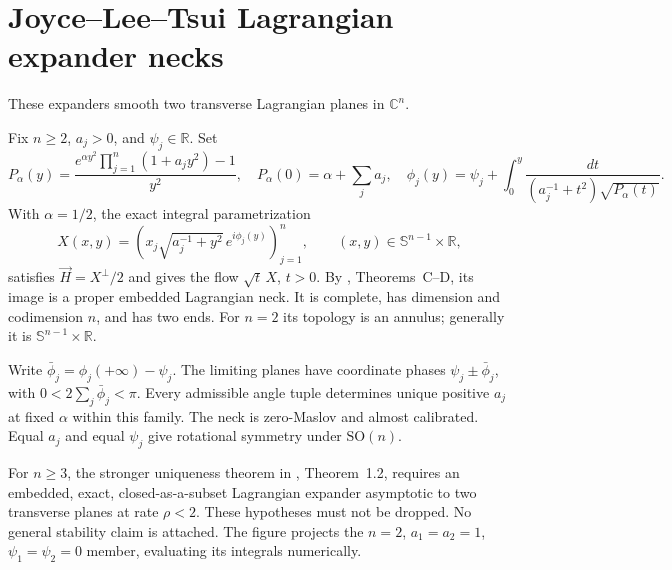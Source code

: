 \chapter{Joyce--Lee--Tsui Lagrangian expander necks}\label{sec:catalogue-jlt-expanders}
These expanders smooth two transverse Lagrangian planes in $\mathbb C^n$.
\begin{example}\label{ex:catalogue-jlt-expanders}
Fix $n\geq2$, $a_j>0$, and $\psi_j\in\mathbb R$. Set
\[
 P_\alpha(y)=\frac{e^{\alpha y^2}\prod_{j=1}^n(1+a_jy^2)-1}{y^2},
 \quad P_\alpha(0)=\alpha+\sum_ja_j,\quad
 \phi_j(y)=\psi_j+\int_0^y\frac{dt}{(a_j^{-1}+t^2)\sqrt{P_\alpha(t)}}.
\]
With $\alpha=1/2$, the exact integral parametrization
\[
 X(x,y)=\left(x_j\sqrt{a_j^{-1}+y^2}\,e^{i\phi_j(y)}\right)_{j=1}^n,
 \qquad (x,y)\in\mathbb S^{n-1}\times\mathbb R,
\]
satisfies $\vec H=X^\perp/2$ and gives the flow $\sqrt t\,X$, $t>0$.
By \cite{CatJoyceLeeTsui2010}, Theorems~C--D, its image is a proper embedded Lagrangian neck. It is complete, has dimension and codimension $n$, and has two ends. For $n=2$ its topology is an annulus; generally it is $\mathbb S^{n-1}\times\mathbb R$.

Write $\bar\phi_j=\phi_j(+\infty)-\psi_j$. The limiting planes have coordinate phases $\psi_j\pm\bar\phi_j$, with $0<2\sum_j\bar\phi_j<\pi$. Every admissible angle tuple determines unique positive $a_j$ at fixed $\alpha$ within this family. The neck is zero-Maslov and almost calibrated. Equal $a_j$ and equal $\psi_j$ give rotational symmetry under $\mathrm{SO}(n)$.

For $n\geq3$, the stronger uniqueness theorem in \cite{CatImagiJoyceOliveira2016}, Theorem~1.2, requires an embedded, exact, closed-as-a-subset Lagrangian expander asymptotic to two transverse planes at rate $\rho<2$. These hypotheses must not be dropped. No general stability claim is attached. The figure projects the $n=2$, $a_1=a_2=1$, $\psi_1=\psi_2=0$ member, evaluating its integrals numerically.
\end{example}

